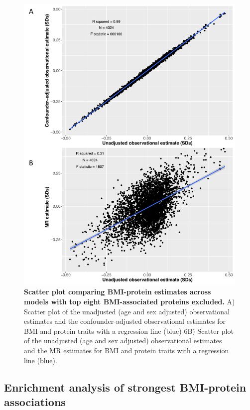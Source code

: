\documentclass[11pt,twoside]{bristolthesis}
\begin{document}
\begin{figure}
\includegraphics[width=0.8\linewidth]{figure/BMI_protein_INTERVAL/Obs_MR_scatter_without_top8} \caption[Scatter plot comparing BMI-protein estimates across models with top eight BMI-associated proteins excluded]{\textbf{Scatter plot comparing BMI-protein estimates across models with top eight BMI-associated proteins excluded.} A) Scatter plot of the unadjusted (age and sex adjusted) observational estimates and the confounder-adjusted observational estimates for BMI and protein traits with a regression line (blue) 6B) Scatter plot of the unadjusted (age and sex adjusted) observational estimates and the MR estimates for BMI and protein traits with a regression line (blue).}\label{fig:Obs-MR-without-top8}
\end{figure}
\hypertarget{enrichment-analysis-of-strongest-bmi-protein-associations}{%
\subsection{Enrichment analysis of strongest BMI-protein associations}\label{enrichment-analysis-of-strongest-bmi-protein-associations}}
\end{document}
